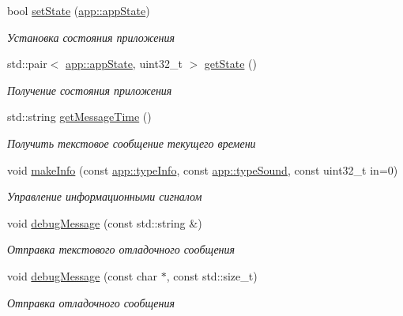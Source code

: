 \begin{DoxyCompactItemize}
bool \hyperlink{classapp_1_1_t_application_a3df1835103a3ba338821c27ad05f9f8d}{set\+State} (\hyperlink{namespaceapp_a290e8080c661e52c2f685fd4af148acf}{app\+::app\+State})
\begin{DoxyCompactList}\small\item\em Установка состояния приложения \end{DoxyCompactList}\item 
std\+::pair$<$ \hyperlink{namespaceapp_a290e8080c661e52c2f685fd4af148acf}{app\+::app\+State}, uint32\+\_\+t $>$ \hyperlink{classapp_1_1_t_application_a254728135b699d84f82a334708b1fbda}{get\+State} ()
\begin{DoxyCompactList}\small\item\em Получение состояния приложения \end{DoxyCompactList}\item 
std\+::string \hyperlink{classapp_1_1_t_application_aa2cb4a923a937f1a47a28fb5efe3b943}{get\+Message\+Time} ()
\begin{DoxyCompactList}\small\item\em Получить текстовое сообщение текущего времени \end{DoxyCompactList}\item 
void \hyperlink{classapp_1_1_t_application_a1d5d4282bfbee6c984b10394f50a6cab}{make\+Info} (const \hyperlink{group___xD0_x9F_xD0_xB5_xD1_x80_xD0_xB5_xD1_x87_xD0_xB8_xD1_x81_xD0_xBB_xD0_xB5_xD0_xBD_xD0_xB8_xD1_x8F_gaf2797b8ed91d66a25b1b3b05ea7bcfc2}{app\+::type\+Info}, const \hyperlink{group___xD0_x9F_xD0_xB5_xD1_x80_xD0_xB5_xD1_x87_xD0_xB8_xD1_x81_xD0_xBB_xD0_xB5_xD0_xBD_xD0_xB8_xD1_x8F_ga33d8f1a04a907b6c65c5dfc88280ac6f}{app\+::type\+Sound}, const uint32\+\_\+t in=0)
\begin{DoxyCompactList}\small\item\em Управление информационными сигналом \end{DoxyCompactList}\item 
void \hyperlink{classapp_1_1_t_application_abec229b87538c5db318ef57f25f6e84d}{debug\+Message} (const std\+::string \&)
\begin{DoxyCompactList}\small\item\em Отправка текстового отладочного сообщения \end{DoxyCompactList}\item 
void \hyperlink{classapp_1_1_t_application_ac0c8e394021c1d1ab4163bc8bd8f7b42}{debug\+Message} (const char $\ast$, const std\+::size\+\_\+t)
\begin{DoxyCompactList}\small\item\em Отправка отладочного сообщения \end{DoxyCompactList}\item 

\end{DoxyCompactItemize}
